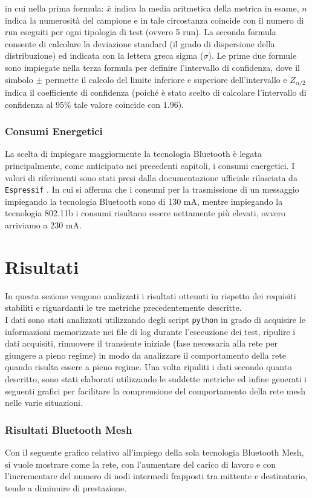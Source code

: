 \noindent in cui nella prima formula: $\bar{x}$ indica la media aritmetica della metrica in esame, $n$ indica la numerosità del campione e in tale circostanza coincide con il numero di run eseguiti per ogni tipologia di test (ovvero 5 run). La seconda formula consente di calcolare la deviazione standard (il grado di dispersione della distribuzione) ed indicata con la lettera greca sigma ($\sigma$). Le prime due formule sono impiegate nella terza formula per definire l'intervallo di confidenza, dove il simbolo $\pm$ permette il calcolo del limite inferiore e superiore dell'intervallo e $Z_{\alpha/2}$ indica il coefficiente di confidenza (poiché è stato scelto di calcolare l'intervallo di confidenza al 95\% tale valore coincide con $1.96$).

\subsubsection{Consumi Energetici}
La scelta di impiegare maggiormente la tecnologia Bluetooth è legata principalmente, come anticipato nei precedenti capitoli, i consumi energetici. I valori di riferimenti sono stati presi dalla documentazione ufficiale rilasciata da \texttt{Espressif} \cite{datasheet2019line}. In cui si afferma che i consumi per la trasmissione di un messaggio impiegando la tecnologia Bluetooth sono di 130 mA, mentre impiegando la tecnologia 802.11b i consumi risultano essere nettamente più elevati, ovvero arriviamo a 230 mA.

\section{Risultati}
In questa sezione vengono analizzati i risultati ottenuti in rispetto dei requisiti stabiliti e riguardanti le tre metriche precedentemente descritte.\\
I dati sono stati analizzati utilizzando degli script \texttt{python} in grado di acquisire le informazioni memorizzate nei file di log durante l'esecuzione dei test, ripulire i dati acquisiti, rimuovere il transiente iniziale (fase necessaria alla rete per giungere a pieno regime) in modo da analizzare il comportamento della rete quando risulta essere a pieno regime. Una volta ripuliti i dati secondo quanto descritto, sono stati elaborati utilizzando le suddette metriche ed infine generati i seguenti grafici per facilitare la comprensione del comportamento della rete mesh nelle varie situazioni.

\subsubsection{Risultati Bluetooth Mesh}
\noindent Con il seguente grafico relativo all'impiego della sola tecnologia Bluetooth Mesh, si vuole mostrare come la rete, con l'aumentare del carico di lavoro e con l'incrementare del numero di nodi intermedi frapposti tra mittente e destinatario, tende a diminuire di prestazione.\\

